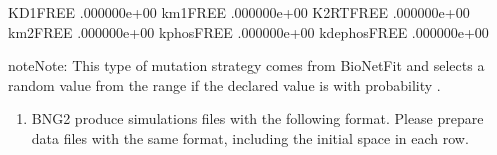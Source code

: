 \documentclass[letterpaper,10pt,english]{sphinxmanual}
\begin{document}
\begin{sphinxVerbatim}[commandchars=\\\{\}]
KD1\PYGZus{}\PYGZus{}FREE\PYGZus{}\PYGZus{}        .000000e+00 
km1\PYGZus{}\PYGZus{}FREE\PYGZus{}\PYGZus{}        .000000e+00 
K2RT\PYGZus{}\PYGZus{}FREE\PYGZus{}\PYGZus{}       .000000e+00 
km2\PYGZus{}\PYGZus{}FREE\PYGZus{}\PYGZus{}        .000000e+00 
kphos\PYGZus{}\PYGZus{}FREE\PYGZus{}\PYGZus{}      .000000e+00 
kdephos\PYGZus{}\PYGZus{}FREE\PYGZus{}\PYGZus{}    .000000e+00 
\end{sphinxVerbatim}

\begin{sphinxadmonition}{note}{Note:}
 This type of mutation strategy comes from BioNetFit and
selects a random value from the range 
if the declared value is  with probability .
\end{sphinxadmonition}
\begin{enumerate}
\def\theenumi{\arabic{enumi}}
\def\labelenumi{\theenumi .}
\makeatletter\def\p@enumii{\p@enumi \theenumi .}\makeatother
\setcounter{enumi}{1}
\item {} 

BNG2 produce simulations files with the following format. Please prepare
data files with the same format, including the initial space in each row.

\end{enumerate}
\end{document}

